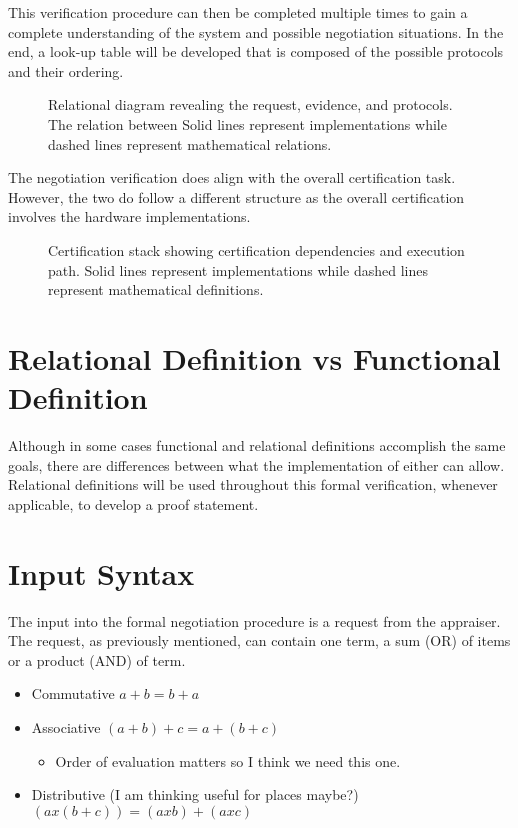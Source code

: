 \documentclass[10pt]{report}
\begin{document}
This verification procedure can then be completed multiple times to gain
a complete understanding of the system and possible negotiation situations.
In the end, a look-up table will be developed that is composed of the possible
protocols and their ordering. 

\begin{figure}[hbtp]
  \centering
  
  \caption[Relational Figure]{ Relational diagram revealing the request,
    evidence, and protocols. The relation between  Solid lines
    represent implementations while dashed lines represent
    mathematical relations.}
  \label{fig:certification-fig}
\end{figure}

The negotiation verification does align with the overall certification task.
However, the two do follow a different structure as the overall certification
involves the hardware implementations. 

\begin{figure}[hbtp]
  \centering
  
  \caption[Certification Figure]{Certification stack showing
    certification dependencies and execution path. Solid lines
    represent implementations while dashed lines represent
    mathematical definitions.}
  \label{fig:certification-fig}
\end{figure}

\section{Relational Definition vs Functional Definition}

Although in some cases functional and relational definitions accomplish
the same goals, there are differences between what the implementation of 
either can allow. Relational definitions will be used throughout this formal
verification, whenever applicable, to develop a proof statement. 

\section{Input Syntax}

The input into the formal negotiation procedure is a request from the appraiser. 
The request, as previously mentioned, can contain one term, a sum (OR) of
items or a product (AND) of term. 

\begin{itemize}
\item Commutative $ a + b = b + a $
\item Associative $ (a + b) + c = a + (b + c) $
  \begin{itemize}
  \item Order of evaluation matters so I think we need this one.
  \end{itemize}
\item Distributive (I am thinking useful for places maybe?)
  $ (a x (b + c)) = (a x b) + (a x c) $
\end{itemize}
\end{document}
